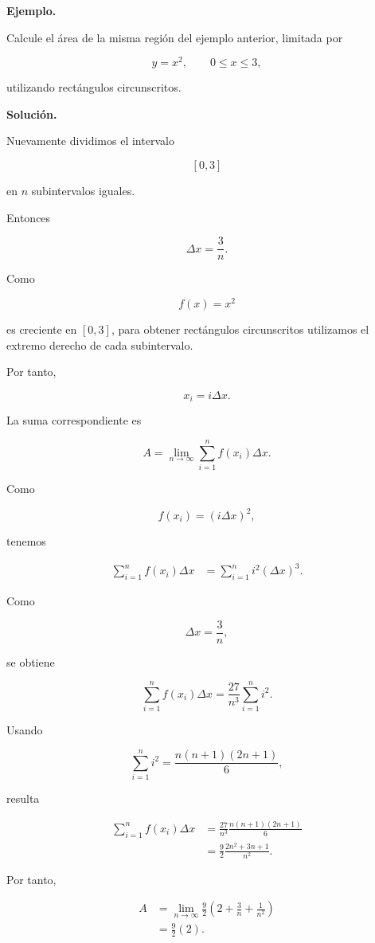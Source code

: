 \documentclass[12pt]{article}
\newenvironment{Ejem}
{\par\medskip\noindent\textbf{Ejemplo.}\ }
{\par\medskip}
\begin{document}

\begin{Ejem}

Calcule el área de la misma región del ejemplo anterior, limitada por

\[
y=x^2,
\qquad
0\leq x\leq3,
\]

utilizando rectángulos circunscritos.

\textbf{Solución.}

Nuevamente dividimos el intervalo

\[
[0,3]
\]

en $n$ subintervalos iguales.

Entonces

\[
\Delta x
=
\frac{3}{n}.
\]

Como

\[
f(x)=x^2
\]

es creciente en $[0,3]$, para obtener rectángulos circunscritos utilizamos
el extremo derecho de cada subintervalo.

Por tanto,

\[
x_i=i\Delta x.
\]

La suma correspondiente es

\[
A
=
\lim_{n\to\infty}
\sum_{i=1}^{n}
f(x_i)\Delta x.
\]

Como

\[
f(x_i)
=
(i\Delta x)^2,
\]

tenemos

\begin{align*}
\sum_{i=1}^{n}
f(x_i)\Delta x
&=
\sum_{i=1}^{n}
i^2(\Delta x)^3.
\end{align*}

Como

\[
\Delta x=\frac{3}{n},
\]

se obtiene

\[
\sum_{i=1}^{n}
f(x_i)\Delta x
=
\frac{27}{n^3}
\sum_{i=1}^{n}i^2.
\]

Usando

\[
\sum_{i=1}^{n}i^2
=
\frac{n(n+1)(2n+1)}{6},
\]

resulta

\begin{align*}
\sum_{i=1}^{n}
f(x_i)\Delta x
&=
\frac{27}{n^3}
\frac{n(n+1)(2n+1)}{6}\\
&=
\frac{9}{2}
\frac{2n^2+3n+1}{n^2}.
\end{align*}

Por tanto,

\begin{align*}
A
&=
\lim_{n\to\infty}
\frac{9}{2}
\left(
2+\frac{3}{n}+\frac{1}{n^2}
\right)\\
&=
\frac{9}{2}(2).
\end{align*}


\end{Ejem}
\end{document}

